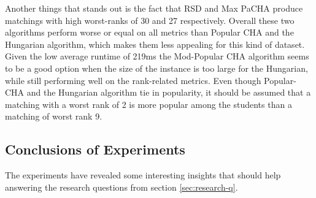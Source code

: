\begin{table}[h!]
  \centering
  \caption{Average results for large uniform dataset with complete preferences.}
  \label{tab:results-uniform-large-complete}
\end{table}

Another things that stands out is the fact that RSD and Max PaCHA produce matchings with high worst-ranks of 30 and 27 respectively. Overall these two algorithms perform worse or equal on all metrics than Popular CHA and the Hungarian algorithm, which makes them less appealing for this kind of dataset. Given the low average runtime of 219ms the Mod-Popular CHA algorithm seems to be a good option when the size of the instance is too large for the Hungarian, while still performing well on the rank-related metrics. Even though Popular-CHA and the Hungarian algorithm tie in popularity, it should be assumed that a matching with a worst rank of 2 is more popular among the students than a matching of worst rank 9. 

\subsection{Conclusions of Experiments}
The experiments have revealed some interesting insights that should help answering the research questions from section \ref{sec:research-q}.

